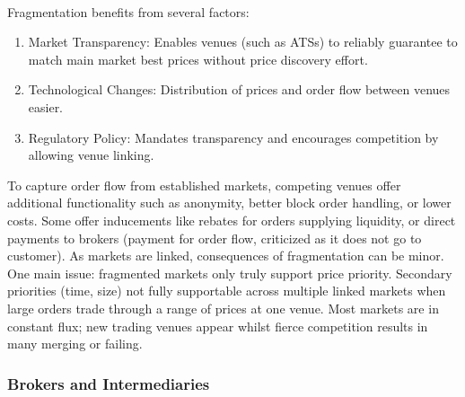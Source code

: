 \begin{remark} \\
Fragmentation benefits from several factors:
\begin{enumerate}[label=\roman*.]
\setlength{\itemsep}{0pt}
\item Market Transparency: Enables venues (such as ATSs) to reliably guarantee to match main market best prices without price discovery effort.
\item Technological Changes: Distribution of prices and order flow between venues easier.
\item Regulatory Policy: Mandates transparency and encourages competition by allowing venue linking.
\end{enumerate}
To capture order flow from established markets, competing venues offer additional functionality such as anonymity, better block order handling, or lower costs. Some offer inducements like rebates for orders supplying liquidity, or direct payments to brokers (payment for order flow, criticized as it does not go to customer). As markets are linked, consequences of fragmentation can be minor. One main issue: fragmented markets only truly support price priority. Secondary priorities (time, size) not fully supportable across multiple linked markets when large orders trade through a range of prices at one venue. Most markets are in constant flux; new trading venues appear whilst fierce competition results in many merging or failing.
\end{remark}


\subsubsection{Brokers and Intermediaries}
